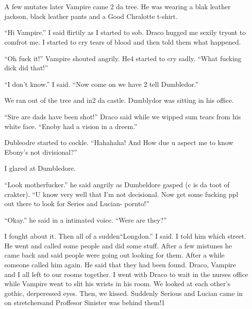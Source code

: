\section{}



A few mutates later Vampire came 2 da tree. He was wearing a blak leather jackson, black leather pants and a Good Chralotte t-shirt.

\enquote{Hi Vampire.} I said flirtily as I started to sob. Draco hugged me sexily tryont to comfrot me. I started to cry tears of blood and then told them what happened.

\enquote{Oh fuck it!} Vampire shouted angrily. He4 started to cry sadly. \enquote{What fucking dick did that!}

\enquote{I don't know.} I said. \enquote{Now come on we have 2 tell Dumbledor.}

We ran out of the tree and in2 da castle. Dumblydor was sitting in his office.

\enquote{Sire are dads have been shot!} Draco said while we wipped sum tears from his white face. \enquote{Enoby had a vision in a dreem.}

Dubleodre started to cockle. \enquote{Hahahaha! And How due u aspect me to know Ebony's not divisional?}

I glared at Dumbledore.

\enquote{Look motherfucker.} he said angrily as Dumbeldore gasped (c is da toot of crakter). \enquote{U know very well that I'm not decisional. Now get some fucking ppl out there to look for Series and Lucian- pornto!}

\enquote{Okay.} he said in a intimated voice. \enquote{Were are they?}

I fought about it. Then all of a sudden\dotfill \enquote{Longdon.} I said. I told him which street. He went and called some people and did some stuff. After a few mistunes he came back and said people were going out looking for them. After a while someone called him again. He said that they had been found. Draco, Vampire and I all left to our rooms together. I went with Draco to wait in the nurses office while Vampire went to slit his wrists in his room. We looked at each other's gothic, derperessed eyes. Then, we kissed. Suddenly Serious and Lucian came in on stretchers\dotfill\newline\phantom{}\dotfill and Proffesor Sinister was behind them!1

